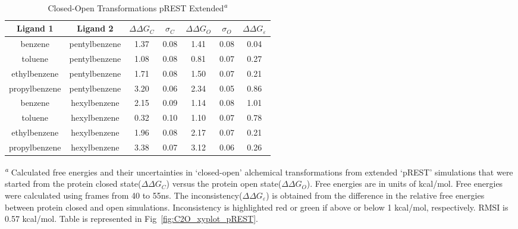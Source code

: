 \begin{table}[!htb]
\centering
\caption{Closed-Open Transformations pREST Extended\textsuperscript{\emph{a}}}
\label{tbl:C-O_pREST-40-55ns}
\begin{tabular}{|c|c|c|c|c|c|c|}
\hline
\textbf{Ligand 1}       & \textbf{Ligand 2}    & \boldmath$\Delta\Delta G_{C}$ & \boldmath$\sigma_{C}$ & \boldmath$\Delta\Delta G_{O}$ & \boldmath$\sigma_{O}$ & \boldmath$\Delta\Delta G_{\varepsilon}$ \\ \hline
benzene         & pentylbenzene & 1.37       & 0.08     & 1.41    & 0.08      & \cellcolor[HTML]{9AFF99}0.04 \\ \hline
toluene         & pentylbenzene & 1.08       & 0.08     & 0.81    & 0.07      & \cellcolor[HTML]{9AFF99}0.27 \\ \hline
ethylbenzene    & pentylbenzene & 1.71       & 0.08     & 1.50    & 0.07      & \cellcolor[HTML]{9AFF99}0.21 \\ \hline
propylbenzene & pentylbenzene & 3.20       & 0.06     & 2.34    & 0.05      & \cellcolor[HTML]{9AFF99}0.86 \\ \hline
benzene         & hexylbenzene  & 2.15       & 0.09     & 1.14    & 0.08      & \cellcolor[HTML]{FFCCC9}1.01 \\ \hline
toluene         & hexylbenzene  & 0.32       & 0.10     & 1.10    & 0.07      & \cellcolor[HTML]{9AFF99}0.78 \\ \hline
ethylbenzene    & hexylbenzene  & 1.96       & 0.08     & 2.17    & 0.07      & \cellcolor[HTML]{9AFF99}0.21 \\ \hline
propylbenzene & hexylbenzene  & 3.38       & 0.07     & 3.12    & 0.06      & \cellcolor[HTML]{9AFF99}0.26 \\ \hline
\end{tabular}

\textsuperscript{\emph{a}} Calculated free energies and their uncertainties in `closed-open' alchemical transformations from extended `pREST' simulations that were started from the protein closed state(\boldmath$\Delta\Delta G_{C}$) versus the protein open state(\boldmath$\Delta\Delta G_{O}$). 
Free energies are in units of kcal/mol.
Free energies were calculated using frames from 40 to 55ns. 
The inconsistency(\boldmath$\Delta\Delta G_{\varepsilon}$) is obtained from the difference in the relative free energies between protein closed and open simulations. 
Inconsistency is highlighted red or green if above or below 1 kcal/mol, respectively.
RMSI is 0.57 kcal/mol.
Table is represented in Fig~\ref{fig:C2O_xyplot_pREST}.
\end{table}


